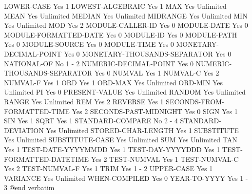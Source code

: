 LOWER-CASE                      Yes             1
LOWEST-ALGEBRAIC                Yes             1
MAX                             Yes             Unlimited
MEAN                            Yes             Unlimited
MEDIAN                          Yes             Unlimited
MIDRANGE                        Yes             Unlimited
MIN                             Yes             Unlimited
MOD                             Yes             2
MODULE-CALLER-ID                Yes             0
MODULE-DATE                     Yes             0
MODULE-FORMATTED-DATE           Yes             0
MODULE-ID                       Yes             0
MODULE-PATH                     Yes             0
MODULE-SOURCE                   Yes             0
MODULE-TIME                     Yes             0
MONETARY-DECIMAL-POINT          Yes             0
MONETARY-THOUSANDS-SEPARATOR    Yes             0
NATIONAL-OF                     No              1 - 2
NUMERIC-DECIMAL-POINT           Yes             0
NUMERIC-THOUSANDS-SEPARATOR     Yes             0
NUMVAL                          Yes             1
NUMVAL-C                        Yes             2
NUMVAL-F                        Yes             1
ORD                             Yes             1
ORD-MAX                         Yes             Unlimited
ORD-MIN                         Yes             Unlimited
PI                              Yes             0
PRESENT-VALUE                   Yes             Unlimited
RANDOM                          Yes             Unlimited
RANGE                           Yes             Unlimited
REM                             Yes             2
REVERSE                         Yes             1
SECONDS-FROM-FORMATTED-TIME     Yes             2
SECONDS-PAST-MIDNIGHT           Yes             0
SIGN                            Yes             1
SIN                             Yes             1
SQRT                            Yes             1
STANDARD-COMPARE                No              2 - 4
STANDARD-DEVIATION              Yes             Unlimited
STORED-CHAR-LENGTH              Yes             1
SUBSTITUTE                      Yes             Unlimited
SUBSTITUTE-CASE                 Yes             Unlimited
SUM                             Yes             Unlimited
TAN                             Yes             1
TEST-DATE-YYYYMMDD              Yes             1
TEST-DAY-YYYYDDD                Yes             1
TEST-FORMATTED-DATETIME         Yes             2
TEST-NUMVAL                     Yes             1
TEST-NUMVAL-C                   Yes             2
TEST-NUMVAL-F                   Yes             1
TRIM                            Yes             1 - 2
UPPER-CASE                      Yes             1
VARIANCE                        Yes             Unlimited
WHEN-COMPILED                   Yes             0
YEAR-TO-YYYY                    Yes             1 - 3
@end verbatim
